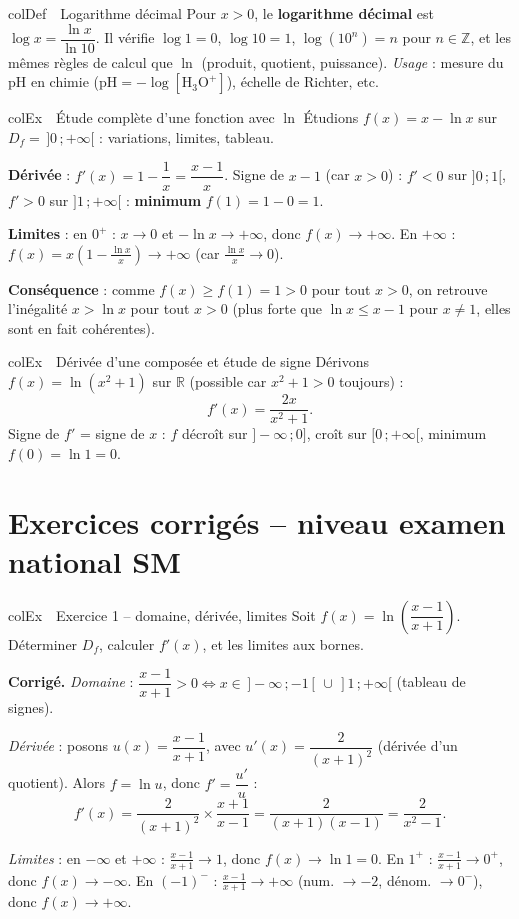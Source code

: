 \documentclass[11pt,a4paper]{article}
\newenvironment{definition}[1][Définition]
  {\begin{fiche}{colDef}{\ding{110}~~#1}}{\end{fiche}}
\newenvironment{exemple}[1][Exemple]
  {\begin{fiche}{colEx}{\ding{217}~~#1}}{\end{fiche}}
\begin{document}
\begin{definition}[Logarithme décimal]
Pour $x>0$, le \textbf{logarithme décimal} est $\log x = \dfrac{\ln x}{\ln 10}$. Il vérifie $\log 1=0$, $\log 10=1$, $\log(10^n)=n$ pour $n\in\mathbb{Z}$, et les mêmes règles de calcul que $\ln$ (produit, quotient, puissance). \emph{Usage} : mesure du pH en chimie ($\text{pH}=-\log[\text{H}_3\text{O}^+]$), échelle de Richter, etc.
\end{definition}

\begin{exemple}[Étude complète d'une fonction avec $\ln$]
Étudions $f(x) = x - \ln x$ sur $D_f=\,]0\,;+\infty[$ : variations, limites, tableau.

\smallskip
\textbf{Dérivée} : $f'(x) = 1 - \dfrac1x = \dfrac{x-1}{x}$. Signe de $x-1$ (car $x>0$) : $f'<0$ sur $]0\,;1[$, $f'>0$ sur $]1\,;+\infty[$ : \textbf{minimum} $f(1) = 1 - 0 = 1$.

\smallskip
\textbf{Limites} : en $0^+$ : $x\to0$ et $-\ln x\to+\infty$, donc $f(x)\to+\infty$. En $+\infty$ : $f(x)=x\left(1-\frac{\ln x}{x}\right)\to+\infty$ (car $\frac{\ln x}{x}\to0$).

\smallskip
\textbf{Conséquence} : comme $f(x)\geq f(1)=1>0$ pour tout $x>0$, on retrouve l'inégalité $x > \ln x$ pour tout $x>0$ (plus forte que $\ln x \leq x-1$ pour $x\ne1$, elles sont en fait cohérentes).
\end{exemple}

\begin{exemple}[Dérivée d'une composée et étude de signe]
Dérivons $f(x)=\ln\left(x^2+1\right)$ sur $\mathbb{R}$ (possible car $x^2+1>0$ toujours) :
\[
  f'(x) = \frac{2x}{x^2+1}.
\]
Signe de $f'$ = signe de $x$ : $f$ décroît sur $]-\infty\,;0]$, croît sur $[0\,;+\infty[$, minimum $f(0)=\ln1=0$.
\end{exemple}

\section{Exercices corrigés -- niveau examen national SM}

\begin{exemple}[Exercice 1 -- domaine, dérivée, limites]
Soit $f(x) = \ln\left(\dfrac{x-1}{x+1}\right)$. Déterminer $D_f$, calculer $f'(x)$, et les limites aux bornes.

\smallskip
\textbf{Corrigé.} \emph{Domaine} : $\dfrac{x-1}{x+1}>0 \iff x\in\,]-\infty\,;-1[\,\cup\,]1\,;+\infty[$ (tableau de signes).

\smallskip
\emph{Dérivée} : posons $u(x)=\dfrac{x-1}{x+1}$, avec $u'(x) = \dfrac{2}{(x+1)^2}$ (dérivée d'un quotient). Alors $f=\ln u$, donc $f'=\dfrac{u'}{u}$ :
\[
  f'(x) = \frac{2}{(x+1)^2}\times\frac{x+1}{x-1} = \frac{2}{(x+1)(x-1)} = \frac{2}{x^2-1}.
\]

\smallskip
\emph{Limites} : en $-\infty$ et $+\infty$ : $\frac{x-1}{x+1}\to1$, donc $f(x)\to\ln1=0$. En $1^+$ : $\frac{x-1}{x+1}\to0^+$, donc $f(x)\to-\infty$. En $(-1)^-$ : $\frac{x-1}{x+1}\to+\infty$ (num. $\to-2$, dénom. $\to0^-$), donc $f(x)\to+\infty$.
\end{exemple}
\end{document}
